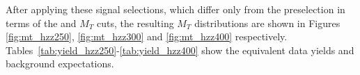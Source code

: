 After applying these signal selections, which differ only from the \zz preselection
in terms of the \met and $M_T$ cuts, the resulting $M_T$ distributions are shown
in Figures \ref{fig:mt_hzz250}, \ref{fig:mt_hzz300} and \ref{fig:mt_hzz400} respectively.
Tables~\ref{tab:yield_hzz250}-\ref{tab:yield_hzz400} show the equivalent data yields
and background expectations.




